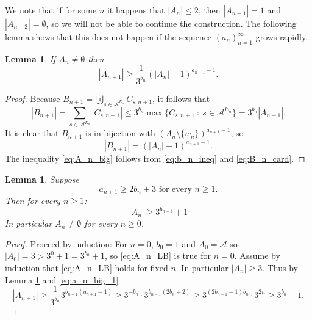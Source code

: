 \documentclass[oneside,english]{amsart}
\newtheorem{lem}[thm]{Lemma}
\theoremstyle{definition}
\newcommand{\AAA}{\mathcal{A}}
\begin{document}
We note  that if for some $n$ it happens that $|A_n| \le 2$, then $|A_{n+1}| = 1$ and $|A_{n+2}|= \emptyset$, so we will not be able to continue the construction.
The following lemma shows that this does not happen if the sequence $(a_n)_{n=1}^\infty$ grows rapidly.
\begin{lem}\label{lem:A_n_big}
If $A_n \ne \emptyset$ then
\begin{equation}\label{eq:A_n_big}
|A_{n+1}| \ge \frac{1}{3^{b_{n}}}\left( |A_n| -1\right)^{a_{n+1} -1}.
\end{equation}

\end{lem}
\begin{proof}
Because $B_{n+1} = \biguplus_{ s\in \AAA^{E_{n}}}C_{s,n+1}$, it follows that
\begin{equation}\label{eq:b_n_ineq}
|B_{n+1}| = \sum_{s \in \AAA^{E_{n}}} |C_{s,n+1}|\le 3^{b_{n}} \max\{C_{s,n+1}~:~s \in \AAA^{E_{n}}\} =  3^{b_{n}} |A_{n+1}|.
\end{equation}
It is clear that $B_{n+1}$ is in bijection with $(A_n \setminus \{w_n\})^{a_{n+1}-1}$, so
\begin{equation}\label{eq:B_n_card}
|B_{n+1}| = \left( |A_n| -1\right)^{a_{n+1} -1}.
\end{equation}
The inequality \eqref{eq:A_n_big} follows from \eqref{eq:b_n_ineq} and \eqref{eq:B_n_card}.
\end{proof}

\begin{lem}\label{lem:A_n_not_empty}
Suppose
\begin{equation}\label{eq:a_n_big_1}
a_{n+1} \ge 2b_{n} +3 \mbox{ for every } n \ge 1.
\end{equation}
 Then for every $n \ge 1$:
\begin{equation}\label{eq:A_n_LB}
|A_n| \ge 3^{b_{n-1}}+1
\end{equation}
In particular  $A_n \ne \emptyset$ for every $n \ge 0$.
\end{lem}
\begin{proof}
Proceed  by induction:
For $n=0$, $b_0=1$ and $A_0 = \AAA$ so $|A_0| = 3 > 3^0+1=3^{b_0}+1$, so \eqref{eq:A_n_LB} is true for $n=0$.
Assume by induction that \eqref{eq:A_n_LB} holds for fixed $n$.
In particular  $|A_n| \ge 3$. Thus by Lemma \ref{lem:A_n_big} and \eqref{eq:a_n_big_1}
$$ |A_{n+1}| \ge  \frac{1}{3^{b_{n}}}3^{b_{n-1}(a_{n+1}-1)} \ge 3^{-b_{n}}\cdot 3^{b_{n-1}(2b_{n} +2)} \ge 3^{(2b_{n-1}-1)b_n}\cdot 3^{2n}\ge 3^{b_{n}} +1.$$
\end{proof}
\end{document}
